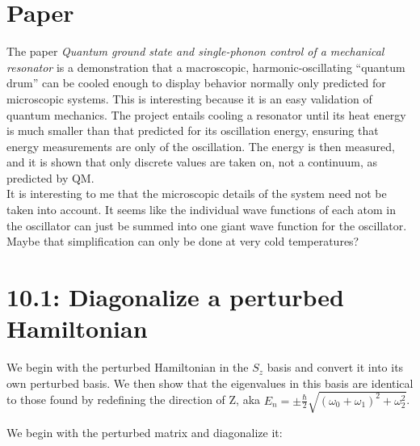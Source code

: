 \documentclass[10pt]{article} %
\begin{document}
\section{Paper}
The paper \textit{Quantum ground state and single-phonon control of a mechanical resonator} is a
demonstration that a macroscopic, harmonic-oscillating ``quantum drum'' can be cooled enough to
display behavior normally only predicted for microscopic systems. This is interesting because it
is an easy validation of quantum mechanics. The project entails cooling a resonator until its
heat energy is much smaller than that predicted for its oscillation energy, ensuring that
energy measurements are only of the oscillation. The energy is then measured, and it is shown that
only discrete values are taken on, not a continuum, as predicted by QM.\\

It is interesting to me that the microscopic details of the system need not be taken into account.
It seems like the individual wave functions of each atom in the oscillator can just be summed
into one giant wave function for the oscillator. Maybe that simplification can only be done at
very cold temperatures?\\

\section{10.1: Diagonalize a perturbed Hamiltonian}
We begin with the perturbed Hamiltonian in the $S_z$ basis and convert it into its own perturbed
basis. We then show that the eigenvalues in this basis are identical to those found by redefining
the direction of Z, aka $E_n = \pm \frac{\hbar}{2} \sqrt{(\omega_0 + \omega_1)^2 + \omega_2^2}$.

We begin with the perturbed matrix and diagonalize it:\\
\end{document}
